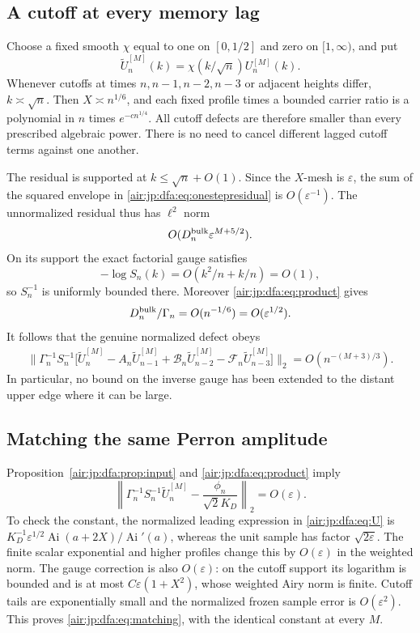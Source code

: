 \documentclass[11pt,letterpaper]{article}
\numberwithin{equation}{section}
\theoremstyle{remark}
\newcommand{\Ai}{\operatorname{Ai}}
\newcommand{\eps}{\varepsilon}
\newcommand{\normtwo}[1]{\left\lVert#1\right\rVert_2}
\begin{document}
\subsection{A cutoff at every memory lag}
Choose a fixed smooth $\chi$ equal to one on $[0,1/2]$ and zero on $[1,\infty)$, and put
\begin{equation}\label{air:jp:dfa:eq:cutoff}
 \widetilde U_n^{[M]}(k)=\chi(k/\sqrt n)U_n^{[M]}(k).
\end{equation}
Whenever cutoffs at times $n,n-1,n-2,n-3$ or adjacent heights differ, $k\asymp\sqrt n$. Then $X\asymp n^{1/6}$, and each fixed profile times a bounded carrier ratio is a polynomial in $n$ times $e^{-cn^{1/4}}$. All cutoff defects are therefore smaller than every prescribed algebraic power. There is no need to cancel different lagged cutoff terms against one another.

The residual is supported at $k\le\sqrt n+O(1)$. Since the $X$-mesh is $\eps$, the sum of the squared envelope in \eqref{air:jp:dfa:eq:onestepresidual} is $O(\eps^{-1})$. The unnormalized residual thus has $\ell^2$ norm
\[
 O(D_n^{\rm bulk}\eps^{M+5/2}).
\]
On its support the exact factorial gauge satisfies
\[
 -\log S_n(k)=O(k^2/n+k/n)=O(1),
\]
so $S_n^{-1}$ is uniformly bounded there. Moreover \eqref{air:jp:dfa:eq:product} gives
\[
 D_n^{\rm bulk}/\Gamma_n=O(n^{-1/6})=O(\eps^{1/2}).
\]
It follows that the genuine normalized defect obeys
\begin{align}
 \bigl\|\Gamma_n^{-1}S_n^{-1}\bigl[\widetilde U_n^{[M]}-A_n\widetilde U_{n-1}^{[M]}
 +\mathcal B_n\widetilde U_{n-2}^{[M]}-\mathcal F_n\widetilde U_{n-3}^{[M]}\bigr]\bigr\|_2
 =O(n^{-(M+3)/3}).\label{air:jp:dfa:eq:residualnorm}
\end{align}
In particular, no bound on the inverse gauge has been extended to the distant upper edge where it can be large.

\subsection{Matching the same Perron amplitude}
Proposition~\ref{air:jp:dfa:prop:input} and \eqref{air:jp:dfa:eq:product} imply
\begin{equation}\label{air:jp:dfa:eq:matching}
 \normtwo{\Gamma_n^{-1}S_n^{-1}\widetilde U_n^{[M]}
 -\frac{\phi_n}{\sqrt2K_D}}=O(\eps).
\end{equation}
To check the constant, the normalized leading expression in \eqref{air:jp:dfa:eq:U} is $K_D^{-1}\eps^{1/2}\Ai(a+2X)/\Ai'(a)$, whereas the unit sample has factor $\sqrt{2\eps}$. The finite scalar exponential and higher profiles change this by $O(\eps)$ in the weighted norm. The gauge correction is also $O(\eps)$: on the cutoff support its logarithm is bounded and is at most $C\eps(1+X^2)$, whose weighted Airy norm is finite. Cutoff tails are exponentially small and the normalized frozen sample error is $O(\eps^2)$. This proves \eqref{air:jp:dfa:eq:matching}, with the identical constant at every $M$.
\end{document}
